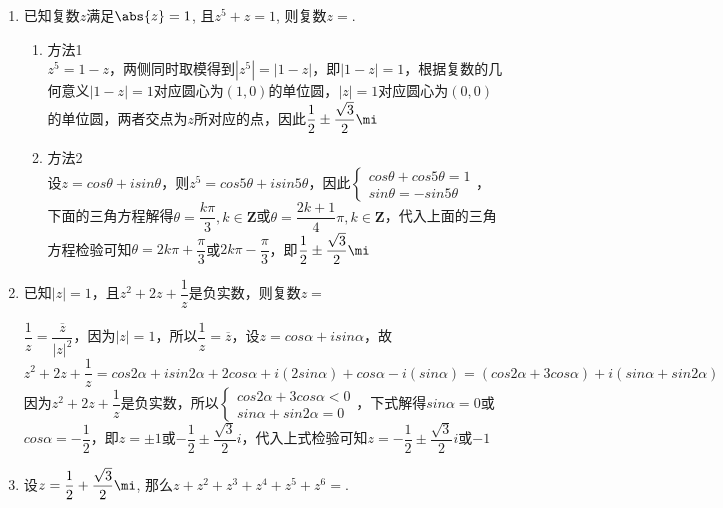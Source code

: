 \begin{enumerate}
\begin{enumerate}
        \item 已知复数$z$满足$\abs{z}=1$, 且$z^5+z=1$, 则复数$z=$.
        \begin{jieda}
            \begin{enumerate}
                \item 方法1 \\
                $z^5 = 1-z$，两侧同时取模得到$|z^5| = |1-z|$，即$|1-z| = 1$，根据复数的几何意义$|1-z| = 1$对应圆心为$(1, 0)$的单位圆，$|z| = 1$对应圆心为$(0, 0)$的单位圆，两者交点为$z$所对应的点，因此$\dfrac{1}{2}\pm\dfrac{\sqrt{3}}{2}\mi$
                \item 方法2 \\
                设$z = cos\theta + i sin\theta$，则$z^5 = cos5\theta+isin5\theta$，因此$\left\{\begin{array}{l}
                     cos\theta + cos5\theta = 1 \\
                     sin\theta = -sin5\theta
                \end{array}\right.$，下面的三角方程解得$\theta = \dfrac{k\pi}{3}, k \in \mathbf{Z}$或$\theta = \dfrac{2k+1}{4}\pi, k \in \mathbf{Z}$，代入上面的三角方程检验可知$\theta = 2k\pi + \dfrac{\pi}{3}$或$2k\pi - \dfrac{\pi}{3}$，即$\dfrac{1}{2}\pm\dfrac{\sqrt{3}}{2}\mi$
            \end{enumerate}
        \end{jieda}
        \item 已知$|z| = 1$，且$z^2+2z+\dfrac{1}{z}$是负实数，则复数$z = $
        \begin{jieda}
            $\dfrac{1}{z} = \dfrac{\overline{z}}{|z|^2}$，因为$|z| = 1$，所以$\dfrac{1}{z} = \overline{z}$，设$z = cos\alpha+i sin\alpha$，故$z^2+2z+\dfrac{1}{z} = cos2\alpha + i sin2\alpha + 2 cos\alpha + i(2sin\alpha) + cos\alpha - i(sin\alpha) = (cos2\alpha + 3cos\alpha) + i(sin\alpha + sin2\alpha)$ \\
            因为$z^2+2z+\dfrac{1}{z}$是负实数，所以$\left \{ \begin{array}{l}
                cos2\alpha + 3cos\alpha < 0   \\
                sin\alpha + sin2\alpha = 0  
            \end{array}\right.$，下式解得$sin\alpha = 0$或$cos\alpha = -\dfrac{1}{2}$，即$z = \pm1$或$-\dfrac{1}{2} \pm \dfrac{\sqrt{3}}{2} i$，代入上式检验可知$z = -\dfrac{1}{2} \pm \dfrac{\sqrt{3}}{2} i$或$-1$
        \end{jieda}
        \item 设$z=\dfrac{1}{2}+\dfrac{\sqrt{3}}{2}\mi$, 那么$z+z^2+z^3+z^4+z^5+z^6=$. 
    \end{enumerate}


\end{enumerate}
